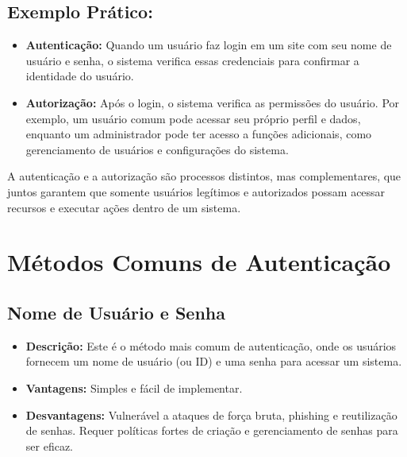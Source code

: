 \documentclass{scrartcl}
\begin{document}
\subsection{Exemplo Prático:}
\label{sec:org489bab7}
\begin{itemize}
\item \textbf{\textbf{Autenticação:}} Quando um usuário faz login em um site com seu nome de
usuário e senha, o sistema verifica essas credenciais para confirmar a
identidade do usuário.
\item \textbf{\textbf{Autorização:}} Após o login, o sistema verifica as permissões do usuário.
Por exemplo, um usuário comum pode acessar seu próprio perfil e dados,
enquanto um administrador pode ter acesso a funções adicionais, como
gerenciamento de usuários e configurações do sistema.
\end{itemize}

A autenticação e a autorização são processos distintos, mas complementares, que
juntos garantem que somente usuários legítimos e autorizados possam acessar
recursos e executar ações dentro de um sistema.

\section{Métodos Comuns de Autenticação}
\label{sec:org4f301dd}
\subsection{Nome de Usuário e Senha}
\label{sec:org6b41dcc}
\begin{itemize}
\item \textbf{\textbf{Descrição:}} Este é o método mais comum de autenticação, onde os usuários
fornecem um nome de usuário (ou ID) e uma senha para acessar um sistema.
\item \textbf{\textbf{Vantagens:}} Simples e fácil de implementar.
\item \textbf{\textbf{Desvantagens:}} Vulnerável a ataques de força bruta, phishing e
reutilização de senhas. Requer políticas fortes de criação e gerenciamento
de senhas para ser eficaz.
\end{itemize}
\end{document}
